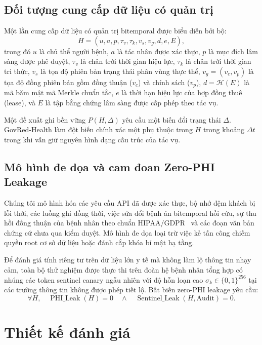 \documentclass[11pt]{article}
\begin{document}
\subsection{Đối tượng cung cấp dữ liệu có quản trị}
Một lần cung cấp dữ liệu có quản trị bitemporal được biểu diễn bởi bộ:
\begin{equation}
H = (u, a, p, \tau_v, \tau_k, v_s, v_g, d, e, E),
\end{equation}
trong đó $u$ là chủ thể người bệnh, $a$ là tác nhân được xác thực, $p$ là mục đích lâm sàng được phê duyệt, $\tau_v$ là chân trời thời gian hiệu lực, $\tau_k$ là chân trời thời gian tri thức, $v_s$ là tọa độ phiên bản trạng thái phân vùng thực thể, $v_g = (v_c, v_p)$ là tọa độ đồng phiên bản gồm đồng thuận ($v_c$) và chính sách ($v_p$), $d = \mathcal{H}(E)$ là mã băm mật mã Merkle chuẩn tắc, $e$ là thời hạn hiệu lực của hợp đồng thuê (lease), và $E$ là tập bằng chứng lâm sàng được cấp phép theo tác vụ.

Một đề xuất ghi bền vững $P(H, \Delta)$ yêu cầu một biến đổi trạng thái $\Delta$. GovRed-Health làm đột biến chính xác một phụ thuộc trong $H$ trong khoảng $\Delta t$ trong khi vẫn giữ nguyên hình dạng cấu trúc của tác vụ.

\subsection{Mô hình đe dọa và cam đoan Zero-PHI Leakage}
Chúng tôi mô hình hóa các yêu cầu API đã được xác thực, bộ nhớ đệm khách bị lỗi thời, các luồng ghi đồng thời, việc sửa đổi bệnh án bitemporal hồi cứu, sự thu hồi đồng thuận của bệnh nhân theo chuẩn HIPAA/GDPR~\cite{fhirconsent,fhirprov} và các đoạn văn bản chứng cứ chưa qua kiểm duyệt. Mô hình đe dọa loại trừ việc kẻ tấn công chiếm quyền root cơ sở dữ liệu hoặc đánh cắp khóa bí mật hạ tầng.

Để đánh giá tính riêng tư trên dữ liệu lớn y tế mà không làm lộ thông tin nhạy cảm, toàn bộ thử nghiệm được thực thi trên đoàn hệ bệnh nhân tổng hợp có nhúng các token sentinel canary ngẫu nhiên với độ hỗn loạn cao $\sigma_k \in \{0, 1\}^{256}$ tại các trường thông tin không được phép tiết lộ. Bất biến zero-PHI leakage yêu cầu:
\begin{equation}
\forall H, \quad \operatorname{PHI\_Leak}(H) = 0 \quad \land \quad \operatorname{Sentinel\_Leak}(H, \text{Audit}) = 0.
\end{equation}

\section{Thiết kế đánh giá}
\end{document}
